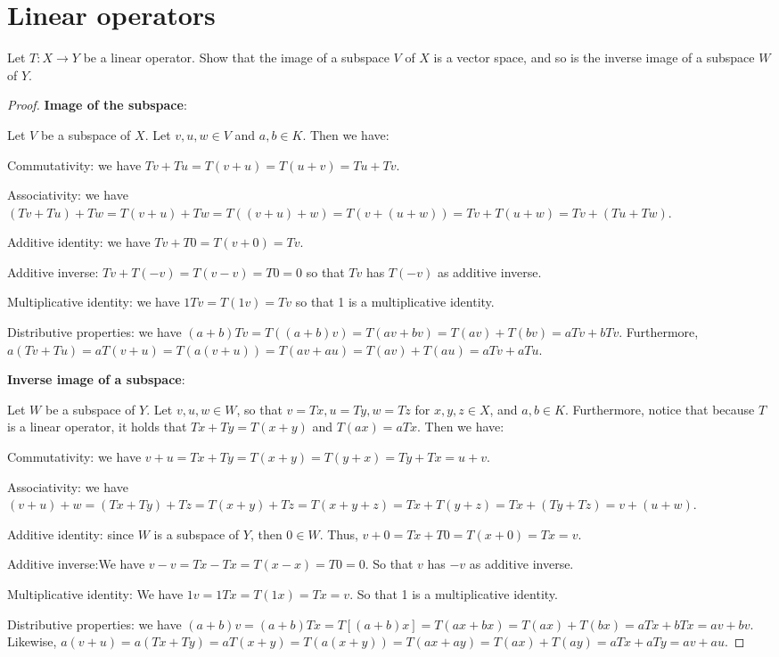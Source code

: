 \section{Linear operators}


\begin{exercise}{5}
Let $T:X\to Y$ be a linear operator. Show that the image of a subspace $V$ of $X$ is a vector space, and so is the inverse image of a subspace $W$ of $Y$.
\end{exercise}
\begin{proof}
\textbf{Image of the subspace}:

Let $V$ be a subspace of $X$. Let $v,u,w\in V$ and $a,b\in K$. Then we have:

Commutativity: we have $Tv+Tu =T(v+u) = T(u+v) =Tu+Tv$.

Associativity: we have $(Tv+Tu)+Tw =T(v+u)+Tw =T((v+u)+w) =T(v+(u+w)) =Tv+T(u+w) =Tv+(Tu+Tw)$.

Additive identity: we have $Tv+T0 =T(v+0) =Tv$.

Additive inverse: $Tv+T(-v) =T(v-v) =T0 =0$ so that $Tv$ has $T(-v)$ as additive inverse.

Multiplicative identity: we have $1Tv= T(1v) =Tv$ so that 1 is a multiplicative identity.

Distributive properties: we have $(a+b)Tv =T((a+b)v) =T(av+bv) =T(av)+T(bv) =aTv+bTv$. Furthermore, $a(Tv+Tu) =aT(v+u) =T(a(v+u)) =T(av+au) =T(av)+T(au) =aTv+aTu$.

\textbf{Inverse image of a subspace}:

Let $W$ be a subspace of $Y$. Let $v,u,w\in W$, so that $v=Tx, u=Ty, w=Tz$ for $x,y,z\in X$, and $a,b\in K$. Furthermore, notice that because $T$ is a linear operator, it holds that $Tx+Ty =T(x+y)$ and $T(ax) =aTx$. Then we have:

Commutativity: we have $v+u =Tx+Ty =T(x+y) =T(y+x) =Ty+Tx =u+v$.

Associativity: we have $(v+u)+w =(Tx+Ty)+Tz =T(x+y)+Tz =T(x+y+z) =Tx+T(y+z) =Tx+(Ty+Tz) =v+(u+w)$.

Additive identity: since $W$ is a subspace of $Y$, then $0\in W$. Thus, $v+0 =Tx+T0 =T(x+0) =Tx =v$.

Additive inverse:We have $v-v =Tx-Tx =T(x-x) =T0 =0$. So that $v$ has $-v$ as additive inverse.

Multiplicative identity: We have $1v =1Tx =T(1x) =Tx =v$. So that 1 is a multiplicative identity.

Distributive properties: we have $(a+b)v =(a+b)Tx =T[(a+b)x] =T(ax+bx) =T(ax)+T(bx) =aTx +bTx =av+bv$. Likewise, $a(v+u) =a(Tx+Ty) =aT(x+y) =T(a(x+y)) =T(ax+ay) =T(ax)+T(ay) =aTx+aTy =av+au$. 
\end{proof}

